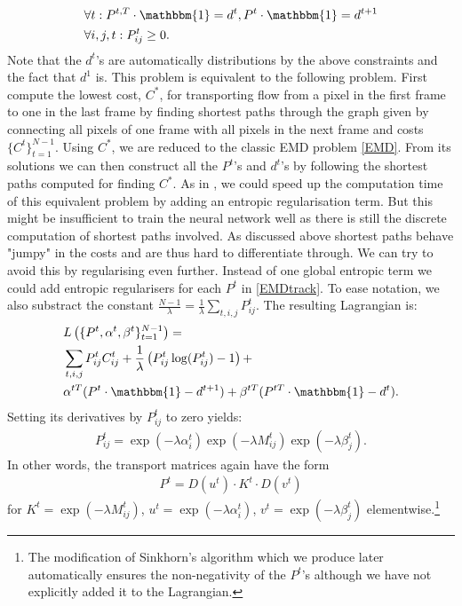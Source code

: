 \documentclass{article}
\begin{document}
{\begin{align}
&\forall t: P^{t,T} \cdot \mathbbm{1} = d^t, P^t\cdot \mathbbm{1} = d^{t+1} \nonumber\\
&\forall i,j,t: P^t_{ij} \geq 0.\nonumber
\end{align}
Note that the $d^t$'s are automatically distributions by the above constraints and the fact that $d^1$ is. This problem is equivalent to the following problem. First compute the lowest cost, $C^*$, for transporting flow from a pixel in the first frame to one in the last frame by finding shortest paths through the graph given by connecting all pixels of one frame with all pixels in the next frame and costs $\{C^t\}_{t=1}^{N-1}$. Using $C^*$, we are reduced to the classic EMD problem \eqref{EMD}. From its solutions we can then construct all the $P^t$'s and $d^t$'s by following the shortest paths computed for finding $C^*$. As in \cite{Cut13}, we could speed up the computation time of this equivalent problem by adding an entropic regularisation term. But this might be insufficient to train the neural network well as there is still the discrete computation of shortest paths involved. As discussed above shortest paths behave "jumpy" in the costs and are thus hard to differentiate through. We can try to avoid this by regularising even further. Instead of one global entropic term we could add entropic regularisers for each $P^t$ in \eqref{EMDtrack}. To ease notation, we also substract the  constant $\frac{N-1}{\lambda} = \frac{1}{\lambda} \sum_{t, i, j} P^t_{ij}$. The resulting Lagrangian is:
\begin{align*}
&L\left(\{P^t, \alpha^t, \beta^t\}_{t=1}^{N-1}\right)
= \\
&\sum_{t, i, j}  P^t_{ij} C^t_{ij} + \frac{1}{\lambda} \left( P^t_{ij}\log(P^t_{ij}) -1\right) +\\
 &\alpha^{t T} (P^t\cdot \mathbbm{1}- d^{t+1}) + \beta^{t T}(P^{tT} \cdot \mathbbm{1} - d^t).
\end{align*}
Setting its derivatives by $P^t_{ij}$ to zero yields:
\begin{align*}
P^t_{ij} = \exp\left(-\lambda\alpha_i^t\right) \exp\left(-\lambda M^t_{ij}\right) \exp\left(- \lambda\beta_j^t\right).
\end{align*}
In other words, the transport matrices again have the form
\begin{align*}
P^t = D(u^t)\cdot K^t \cdot D(v^t) 
\end{align*}
for $K^t = \exp\left(-\lambda M^t_{ij}\right)$, $u^t =\exp\left(-\lambda\alpha_i^t\right)$,  \break $v^t=\exp\left(- \lambda\beta_j^t\right)$ elementwise.\footnote{The modification of Sinkhorn's algorithm which we produce later automatically ensures the non-negativity of the $P^t$'s although we have not explicitly added it to the Lagrangian.}
}
\end{document}
